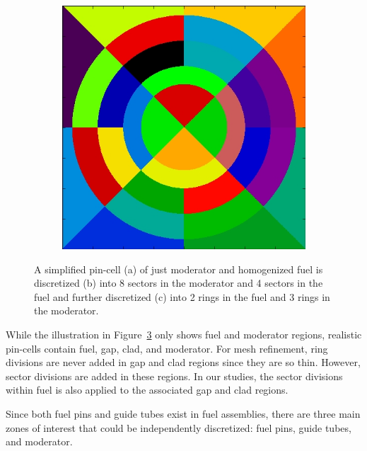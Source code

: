 \begin{figure}[h!]
\begin{subfigure}{0.3\textwidth}
		\caption{}
		\label{fig:rings-sectors-b}
	\end{subfigure}
	\begin{subfigure}{0.3\textwidth}
		\centering
		\includegraphics[width=\linewidth]{figures/ring_sector_discr.jpg}
		\caption{}
		\label{fig:rings-sectors-c}
	\end{subfigure}
	\caption[]{A simplified pin-cell (a) of just moderator and homogenized fuel is discretized (b) into 8 sectors in the moderator and 4 sectors in the fuel and further discretized (c) into 2 rings in the fuel and 3 rings in the moderator.}
	\label{fig:rings-sectors}
\end{figure}

While the illustration in Figure~\ref{fig:rings-sectors} only shows fuel and moderator regions, realistic pin-cells contain fuel, gap, clad, and moderator. For mesh refinement, ring divisions are never added in gap and clad regions since they are so thin. However, sector divisions are added in these regions. In our studies, the sector divisions within fuel is also applied to the associated gap and clad regions.

Since both fuel pins and guide tubes exist in fuel assemblies, there are three main zones of interest that could be independently discretized: fuel pins, guide tubes, and moderator.

